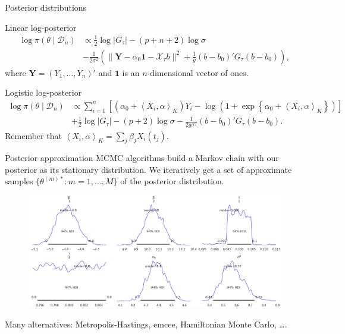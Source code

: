 \documentclass[9pt, english, professionalfonts]{beamer}
\newcommand\maroon[1]{\color{mLightBrown}#1\color{mDarkTeal}}
\newcommand\dotprod[2]{\left\langle #1, #2 \right\rangle}
\begin{document}
\begin{frame}{Posterior distributions}
  \begin{block}{Linear log-posterior}
    \vspace{-1em}
    \begin{align*}
  \log \pi(\theta\mid \mathcal D_n) & \propto \frac{1}{2}\log |G_\tau| - (p+n+2)\log \sigma\\
  &-\frac{1}{2\sigma^2} \left(\|\bm{Y}-\alpha_0\bm{1} - \mathcal X_\tau b\|^2 + \frac{1}{g}(b - b_0)'G_\tau(b - b_0) \right),
\end{align*}
where \(\bm Y=(Y_1,\dots,Y_n)'\) and \(\bm{1}\) is an \(n\)-dimensional vector of ones.
  \end{block}
  \vspace{1em}
  \begin{block}{Logistic log-posterior}
      \vspace{-1em}
    \begin{align*}
  \log \pi(\theta \mid \mathcal D_n) & \propto \sum_{i=1}^n \left[ \left(\alpha_0 + \dotprod{X_i}{\alpha}_K\right)Y_i - \log\left(1 + \exp\left\{\alpha_0 + \dotprod{X_i}{\alpha}_K\right\}\right)\right]\\
  \quad &+ \frac{1}{2}\log |G_\tau| - (p+2)\log \sigma -\frac{1}{2g\sigma^2} (b - b_0)'G_\tau(b - b_0).
\end{align*}
Remember that \(\dotprod{X_i}{\alpha}_K = \sum_j \beta_j X_i(t_j)\).
  \end{block}
\end{frame}

\begin{frame}{Posterior approximation}
 MCMC algorithms build a Markov chain with our posterior as its stationary distribution. We iteratively get a set of approximate samples \(\{\theta^{(m)*}: m=1,\dots, M\}\) of the posterior distribution.

  \begin{figure}
    \centering
    \includegraphics[width=.85\textwidth]{posterior}
  \end{figure}

Many alternatives: Metropolis-Hastings, \maroon{emcee}, Hamiltonian Monte Carlo, \ldots.
\end{frame}
\end{document}
